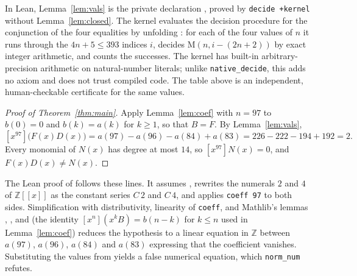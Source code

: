 \documentclass[11pt]{amsart}
\theoremstyle{plain}
\theoremstyle{definition}
\newcommand{\Z}{\mathbb{Z}}
\newcommand{\fps}{\Z[\![x]\!]}
\newcommand{\coef}[1]{[x^{#1}]}
\newcommand{\MI}{\mathrm{M}}
\begin{document}
In Lean, Lemma~\ref{lem:vals} is the private declaration , proved by \texttt{decide +kernel} without Lemma~\ref{lem:closed}. The kernel evaluates the decision procedure for the conjunction of the four equalities by unfolding : for each of the four values of $n$ it runs through the $4n+5\le393$ indices $i$, decides $\MI(n,i-(2n+2))$ by exact integer arithmetic, and counts the successes. The kernel has built-in arbitrary-precision arithmetic on natural-number literals; unlike \texttt{native\_decide}, this adds no axiom and does not trust compiled code. The table above is an independent, human-checkable certificate for the same values.

\begin{proof}[Proof of Theorem~\ref{thm:main}]
Apply Lemma~\ref{lem:coef} with $n=97$ to $b(0)=0$ and $b(k)=a(k)$ for $k\ge1$, so that $B=F$. By Lemma~\ref{lem:vals},
\[
  \coef{97}\bigl(F(x)D(x)\bigr)=a(97)-a(96)-a(84)+a(83)=226-222-194+192=2 .
\]
Every monomial of $N(x)$ has degree at most $14$, so $\coef{97}N(x)=0$, and $F(x)D(x)\ne N(x)$.
\end{proof}

The Lean proof of  follows these lines. It assumes , rewrites the numerals $2$ and $4$ of $\fps$ as the constant series $C\,2$ and $C\,4$, and applies \texttt{coeff 97} to both sides. Simplification with distributivity, linearity of \texttt{coeff}, and Mathlib's lemmas , ,  and  (the identity $\coef{n}(x^kB)=b(n-k)$ for $k\le n$ used in Lemma~\ref{lem:coef}) reduces the hypothesis to a linear equation in $\Z$ between $a(97)$, $a(96)$, $a(84)$ and $a(83)$ expressing that the coefficient vanishes. Substituting the values from  yields a false numerical equation, which \texttt{norm\_num} refutes.
\end{document}
